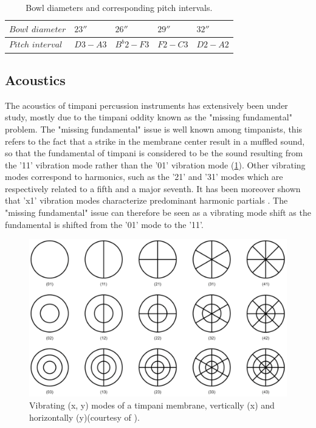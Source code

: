 \begin{table}%
	\centering
	\caption[Bowl diameters and corresponding pitch intervals]{Bowl diameters and corresponding pitch intervals.}
	\vspace{2mm}
	\begin{tabular}{||x{3cm}||x{2cm}|x{2cm}|x{2cm}|x{2cm}||} \hline
		\small{$Bowl$ $diameter$} 	& $23''$ 	& $26''$ 	& $29''$ 	& $32''$	\tabularnewline \hline \hline
		\small{$Pitch$ $interval$} 	& $D3-A3$ 	& $B^b2-F3$ & $F2-C3$ 	& $D2-A2$	\tabularnewline \hline
	\end{tabular}
	\label{tab:timpaniPitch}
\end{table}


		\subsection{Acoustics}
		\label{subsec:Analysis_TimpaniBasics_Acoustics}

The acoustics of timpani percussion instruments has extensively been under study, mostly due to the timpani oddity known as the "missing fundamental" problem. The "missing fundamental" issue is well known among timpanists, this refers to the fact that a strike in the membrane center result in a muffled sound, so that the fundamental of timpani is considered to be the sound resulting from the '11' vibration mode rather than the '01' vibration mode (\myfigname \ref{fig:timpaniModes}). Other vibrating modes correspond to harmonics, such as the '21' and '31' modes which are respectively related to a fifth and a major seventh. It has been moreover shown that 'x1' vibration modes characterize predominant harmonic partials . The "missing fundamental" issue can therefore be seen as a vibrating mode shift as the fundamental is shifted from the '01' mode to the '11'.\\

\begin{figure}[H]
	\begin{center}
		\includegraphics[width=0.8\columnwidth]{Chapters/4/Pics/Pdf/timpaniModes.pdf}
	\end{center}
	\vspace{-0.5cm}
	\caption[Vibrating modes of a timpani membrane]{Vibrating (x, y) modes of a timpani membrane, vertically (x) and horizontally (y)(courtesy of ).}
	\label{fig:timpaniModes}
\end{figure}

